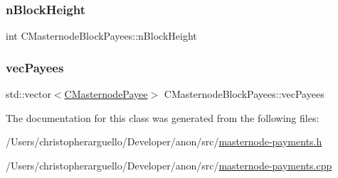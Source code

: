 \subsubsection{\texorpdfstring{n\+Block\+Height}{nBlockHeight}}
{\footnotesize\ttfamily int C\+Masternode\+Block\+Payees\+::n\+Block\+Height}

\mbox{\label{class_c_masternode_block_payees_a61f566bf72c56e12ccf1b3159c867c9d}} 
\subsubsection{\texorpdfstring{vec\+Payees}{vecPayees}}
{\footnotesize\ttfamily std\+::vector$<$\mbox{\hyperlink{class_c_masternode_payee}{C\+Masternode\+Payee}}$>$ C\+Masternode\+Block\+Payees\+::vec\+Payees}



The documentation for this class was generated from the following files\+:\begin{DoxyCompactItemize}
\item 
/\+Users/christopherarguello/\+Developer/anon/src/\mbox{\hyperlink{masternode-payments_8h}{masternode-\/payments.\+h}}\item 
/\+Users/christopherarguello/\+Developer/anon/src/\mbox{\hyperlink{masternode-payments_8cpp}{masternode-\/payments.\+cpp}}\end{DoxyCompactItemize}
